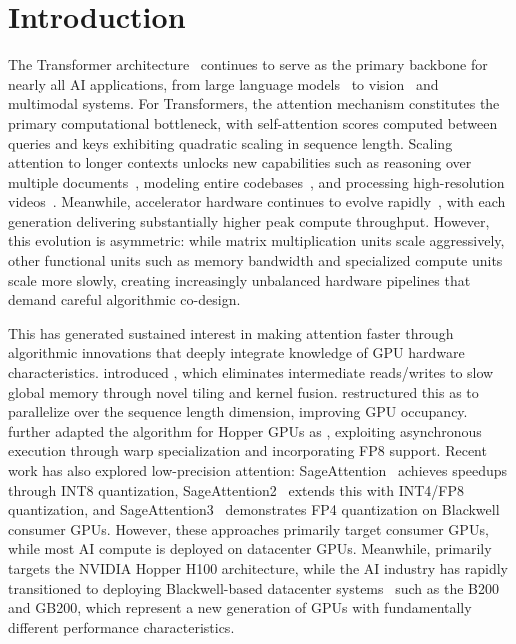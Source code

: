 \section{Introduction}
\label{sec:intro}



The Transformer architecture~\citep{vaswani2017attention} continues to serve as the primary backbone for nearly all AI applications, from large language models~\citep{brown2020language} to vision~\citep{dosovitskiy2020image} and multimodal systems. For Transformers, the attention mechanism constitutes the primary computational bottleneck, with self-attention scores computed between queries and keys exhibiting quadratic scaling in sequence length. Scaling attention to longer contexts unlocks new capabilities such as reasoning over multiple documents~\citep{guo2021longt5,shaham2022scrolls}, modeling entire codebases~\citep{roziere2023code}, and processing high-resolution videos~\citep{chen2022scaling,ho2022video}. Meanwhile, accelerator hardware continues to evolve rapidly~\citep{nvidia2024nvidia}, with each generation delivering substantially higher peak compute throughput. However, this evolution is asymmetric: while matrix multiplication units scale aggressively, other functional units such as memory bandwidth and specialized compute units scale more slowly, creating increasingly unbalanced hardware pipelines that demand careful algorithmic co-design.

This has generated sustained interest in making attention faster through algorithmic innovations that deeply integrate knowledge of GPU hardware characteristics. \citet{dao2022flashattention} introduced \fa, which eliminates intermediate reads/writes to slow global memory through novel tiling and kernel fusion. \citet{dao2023flashattention2} restructured this as \faa to parallelize over the sequence length dimension, improving GPU occupancy. \citet{shah2024flashattention3} further adapted the algorithm for Hopper GPUs as \fat, exploiting asynchronous execution through warp specialization and incorporating FP8 support. Recent work has also explored low-precision attention: SageAttention~\citep{sageattention} achieves speedups through INT8 quantization, SageAttention2~\citep{sageattention2} extends this with INT4/FP8 quantization, and SageAttention3~\citep{sageattention3} demonstrates FP4 quantization on Blackwell consumer GPUs. However, these approaches primarily target consumer GPUs, while most AI compute is deployed on datacenter GPUs. Meanwhile, \fat primarily targets the NVIDIA Hopper H100 architecture, while the AI industry has rapidly transitioned to deploying Blackwell-based datacenter systems~\citep{nvidia2024nvidia} such as the B200 and GB200, which represent a new generation of GPUs with fundamentally different performance characteristics.

